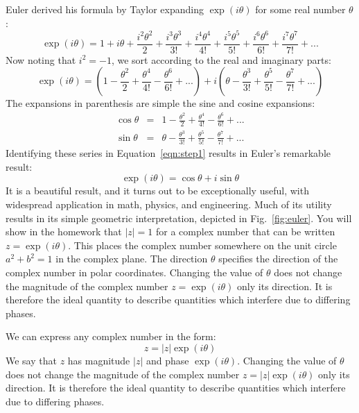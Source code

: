 \documentclass[12pt]{article}
\begin{document}
Euler derived his formula by Taylor expanding $\exp(i \theta)$ for some real number $\theta$:
\begin{equation*}
\exp(i\theta) = 1 + i\theta + \frac{i^2 \theta^2}{2} + \frac{i^3 \theta^3}{3!} + \frac{i^4 \theta^4}{4!}
+ \frac{i^5 \theta^5}{5!} + \frac{i^6 \theta^6}{6!} + \frac{i^7 \theta^7}{7!} + ...
\end{equation*}
Now noting that $i^2=-1$, we sort according to the real and imaginary parts:
\begin{equation} \label{eqn:step1}
\exp(i\theta) = \left( 1 - \frac{\theta^2}{2} + \frac{\theta^4}{4!} -  \frac{\theta^6}{6!} + ... \right)
+ i \left( \theta - \frac{\theta^3}{3!} + \frac{\theta^5}{5!} - \frac{\theta^7}{7!} + ... \right)
\end{equation}
The expansions in parenthesis are simple the sine and cosine expansions:
\begin{eqnarray*}
\cos \theta &=& 1 - \frac{\theta^2}{2} + \frac{\theta^4}{4!} -  \frac{\theta^6}{6!} + ... \\
\sin \theta &=& \theta - \frac{\theta^3}{3!} + \frac{\theta^5}{5!} - \frac{\theta^7}{7!} + ... 
\end{eqnarray*}
Identifying these series in Equation~\ref{eqn:step1} results in Euler's remarkable result:
\begin{equation}
\exp(i\theta) = \cos \theta + i \sin \theta
\end{equation}
It is a beautiful result, and it turns out to be exceptionally useful, with widespread application in math,
physics, and engineering.  Much of its utility results in its simple geometric interpretation, depicted in 
Fig.~\ref{fig:euler}.  You will show in the homework that $|z|=1$ for a complex number that can be written 
$z = \exp(i \theta)$.  This places the complex number somewhere on the unit circle $a^2 + b^2 = 1$ in the
complex plane.  The direction $\theta$ specifies the direction of the complex number in polar coordinates.
Changing the value of $\theta$ does not change the magnitude of the complex number $z = \exp(i \theta)$ only its direction.  It is therefore the ideal quantity to describe quantities which interfere due to differing phases.

We can express any complex number in the form:
\begin{displaymath}
z = |z| \exp(i \theta)
\end{displaymath}
We say that $z$ has magnitude $|z|$ and phase $\exp(i \theta)$.  Changing the value of $\theta$ does not change the magnitude of the complex number $z = |z| \exp(i \theta)$ only its direction.  It is therefore the ideal quantity to describe quantities which interfere due to differing phases.
\end{document}
